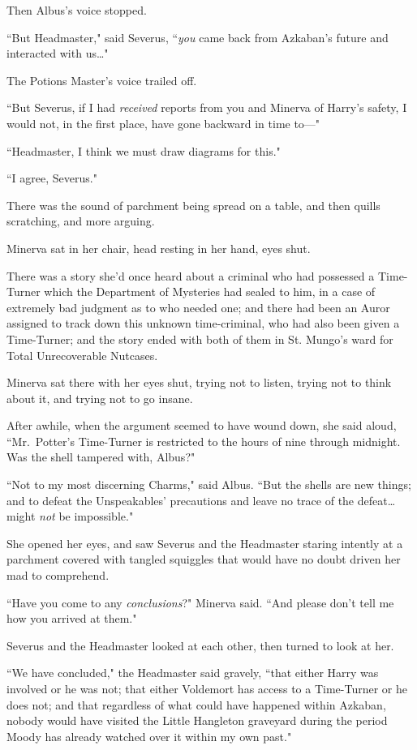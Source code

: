 Then Albus's voice stopped.

``But Headmaster," said Severus, ``\emph{you} came back from Azkaban's future and interacted with us{\ldots}"

The Potions Master's voice trailed off.

``But Severus, if I had \emph{received} reports from you and Minerva of Harry's safety, I would not, in the first place, have gone backward in time to—"

``Headmaster, I think we must draw diagrams for this."

``I agree, Severus."

There was the sound of parchment being spread on a table, and then quills scratching, and more arguing.

Minerva sat in her chair, head resting in her hand, eyes shut.

There was a story she'd once heard about a criminal who had possessed a Time-Turner which the Department of Mysteries had sealed to him, in a case of extremely bad judgment as to who needed one; and there had been an Auror assigned to track down this unknown time-criminal, who had also been given a Time-Turner; and the story ended with both of them in St. Mungo's ward for Total Unrecoverable Nutcases.

Minerva sat there with her eyes shut, trying not to listen, trying not to think about it, and trying not to go insane.

After awhile, when the argument seemed to have wound down, she said aloud, ``Mr.~Potter's Time-Turner is restricted to the hours of nine \pm through midnight. Was the shell tampered with, Albus?"

``Not to my most discerning Charms," said Albus. ``But the shells are new things; and to defeat the Unspeakables' precautions and leave no trace of the defeat{\ldots} might \emph{not} be impossible."

She opened her eyes, and saw Severus and the Headmaster staring intently at a parchment covered with tangled squiggles that would have no doubt driven her mad to comprehend.

``Have you come to any \emph{conclusions}?" Minerva said. ``And please don't tell me how you arrived at them."

Severus and the Headmaster looked at each other, then turned to look at her.

``We have concluded," the Headmaster said gravely, ``that either Harry was involved or he was not; that either Voldemort has access to a Time-Turner or he does not; and that regardless of what could have happened within Azkaban, nobody would have visited the Little Hangleton graveyard during the period Moody has already watched over it within my own past."

